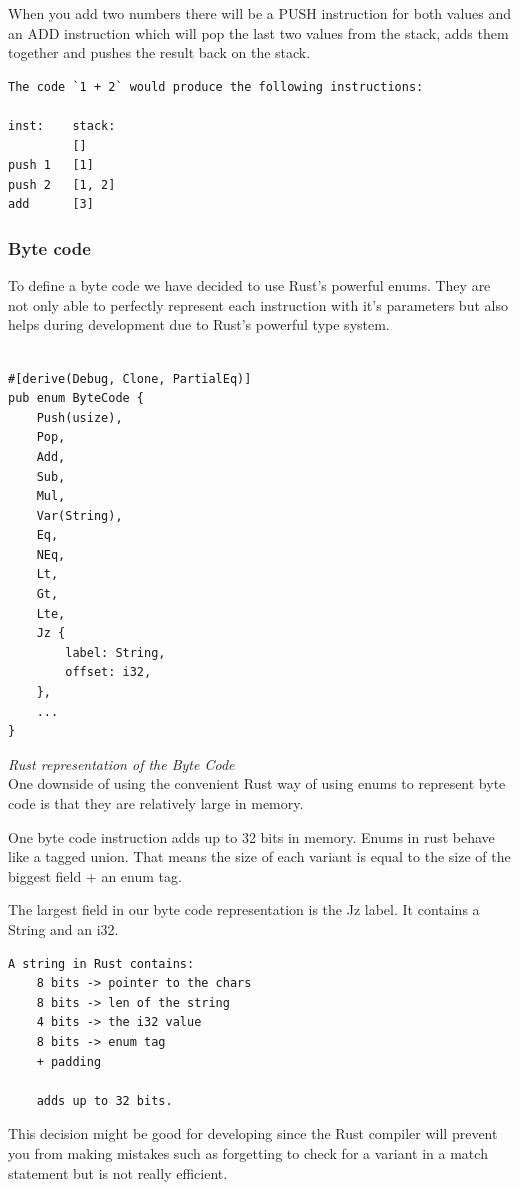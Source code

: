 \documentclass{article}
\begin{document}
When you add two numbers there will be a PUSH instruction for both values
and an ADD instruction which will pop the last two values from the stack,
adds them together and pushes the result back on the stack.

\begin{verbatim}
The code `1 + 2` would produce the following instructions:

inst:    stack:
         []
push 1   [1]
push 2   [1, 2]
add      [3]
\end{verbatim}

\subsubsection{Byte code}
\label{sec:byte_code}

To define a byte code we have decided to use Rust's powerful enums. They are
not only able to perfectly represent each instruction with it's parameters but
also helps during development due to Rust's powerful type system.

\begin{verbatim}

#[derive(Debug, Clone, PartialEq)]
pub enum ByteCode {
    Push(usize),
    Pop,
    Add,
    Sub,
    Mul,
    Var(String),
    Eq,
    NEq,
    Lt,
    Gt,
    Lte,
    Jz {
        label: String,
        offset: i32,
    },
    ...
}

\end{verbatim}
\textit{Rust representation of the Byte Code} \\

One downside of using the convenient Rust way of using enums to represent byte
code is that they are relatively large in memory.

One byte code instruction adds up to 32 bits in memory. 
Enums in rust behave like a tagged union. That means the size of each variant
is equal to the size of the biggest field + an enum tag.

The largest field in our byte code representation is the Jz label. It contains
a String and an i32.

\begin{verbatim}
A string in Rust contains:
    8 bits -> pointer to the chars
    8 bits -> len of the string
    4 bits -> the i32 value
    8 bits -> enum tag
    + padding

    adds up to 32 bits.
\end{verbatim}
This decision might be good for developing since the Rust compiler will prevent
you from making mistakes such as forgetting to check for a variant in a match
statement but is not really efficient.
\end{document}
